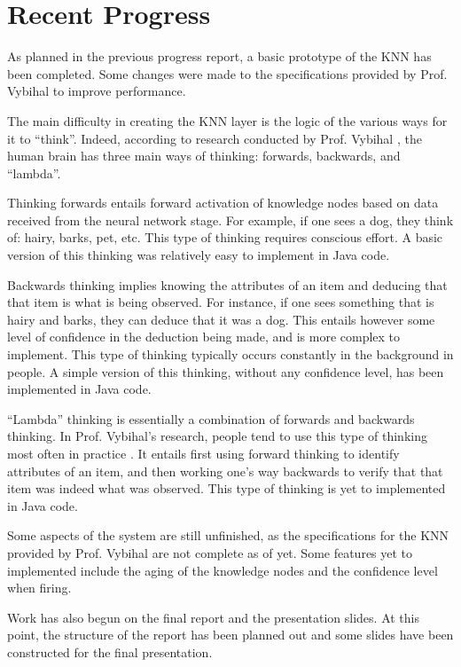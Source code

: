\documentclass[]{article}
\begin{document}
	\section{Recent Progress}
	
	As planned in the previous progress report, a basic prototype of the KNN has been completed. Some changes were made to the specifications provided by Prof. Vybihal to improve performance.
	
	The main difficulty in creating the KNN layer is the logic of the various ways for it to ``think''. Indeed, according to research conducted by Prof. Vybihal \cite{vybihal-lambda}, the human brain has three main ways of thinking: forwards, backwards, and ``lambda''.
	
	Thinking forwards entails forward activation of knowledge nodes based on data received from the neural network stage. For example, if one sees a dog, they think of: hairy, barks, pet, etc. This type of thinking requires conscious effort. A basic version of this thinking was relatively easy to implement in Java code.
	
	Backwards thinking implies knowing the attributes of an item and deducing that that item is what is being observed. For instance, if one sees something that is hairy and barks, they can deduce that it was a dog. This entails however some level of confidence in the deduction being made, and is more complex to implement. This type of thinking typically occurs constantly in the background in people. A simple version of this thinking, without any confidence level, has been implemented in Java code.
	
	``Lambda'' thinking is essentially a combination of forwards and backwards thinking. In Prof. Vybihal's research, people tend to use this type of thinking most often in practice \cite{vybihal-knowledge}. It entails first using forward thinking to identify attributes of an item, and then working one's way backwards to verify that that item was indeed what was observed. This type of thinking is yet to implemented in Java code.
	
	Some aspects of the system are still unfinished, as the specifications for the KNN provided by Prof. Vybihal are not complete as of yet. Some features yet to implemented include the aging of the knowledge nodes and the confidence level when firing.
	
	Work has also begun on the final report and the presentation slides. At this point, the structure of the report has been planned out and some slides have been constructed for the final presentation.
	
\end{document}
